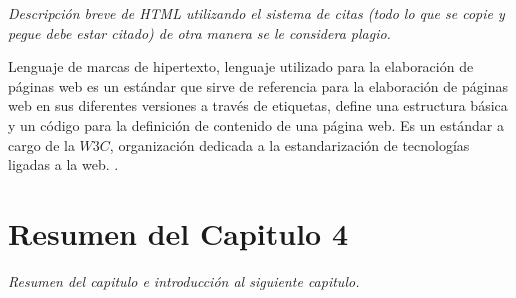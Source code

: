 \textit{Descripción breve de HTML utilizando el sistema de citas (todo lo que se copie y pegue debe estar citado) de otra manera se le considera plagio.}

Lenguaje de marcas de hipertexto, lenguaje utilizado para la elaboración de páginas web es un estándar que sirve de referencia para la elaboración de páginas web en sus diferentes versiones a través de etiquetas, define una estructura básica y un código para la definición de contenido de una página web. Es un estándar a cargo de la $W3C$, organización dedicada a la estandarización de tecnologías ligadas a la web. \cite{html}.

\section{ Resumen del Capitulo 4 }

\textit{Resumen del capitulo e introducción al siguiente capitulo.}

